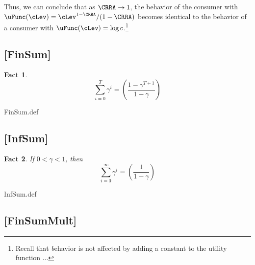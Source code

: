 \documentclass{handout}
\newtheorem{Fact}{Fact}
\providecommand{\currentpdfbookmark}{}
\begin{document}
Thus, we can conclude that as $\CRRA \rightarrow 1$, the behavior of
the consumer with $\uFunc(\cLev)=\cLev^{1-\CRRA}/(1-\CRRA)$ becomes identical to
the behavior of a consumer with $\uFunc(\cLev)=\log c$.\footnote{Recall that {\textit behavior} is not affected by adding a constant to the utility function ...}


\hypertarget{FinSum}{}
\subsection{[FinSum]}\label{fact:FinSum} 


\begin{Fact} 
\begin{equation}
\displaystyle \sum_{i=0}^{T} \gamma^{i} = \left(\frac{1-\gamma^{T+1}}{1-\gamma}\right)
\end{equation} 
\end{Fact}

\begin{verbatimwrite}{FinSum.def}
\providecommand{\FinSum}{\href{https://www.econ2.jhu.edu/people/ccarroll/public/LectureNotes/MathFacts/MathFactsList\#FinSum}{\ensuremath{\mathtt{[FinSum]}}}}
\end{verbatimwrite}


\hypertarget{InfSum}{}

\subsection{[InfSum]}\label{fact:InfSum}


\begin{Fact} If $0 < \gamma < 1$, then 
\begin{equation}
\displaystyle \sum_{i=0}^{\infty} \gamma^{i} = \left(\frac{1}{1-\gamma}\right)
\end{equation}
\end{Fact}

\begin{verbatimwrite}{InfSum.def}
\providecommand{\InfSum}{\href{https://www.econ2.jhu.edu/people/ccarroll/public/LectureNotes/MathFacts/MathFactsList\#InfSum}{\ensuremath{\mathtt{[InfSum]}}}}
\end{verbatimwrite}

\hypertarget{FinSumMult}{}
\subsection{[FinSumMult]}\label{fact:FinSumMult} 
\end{document}
